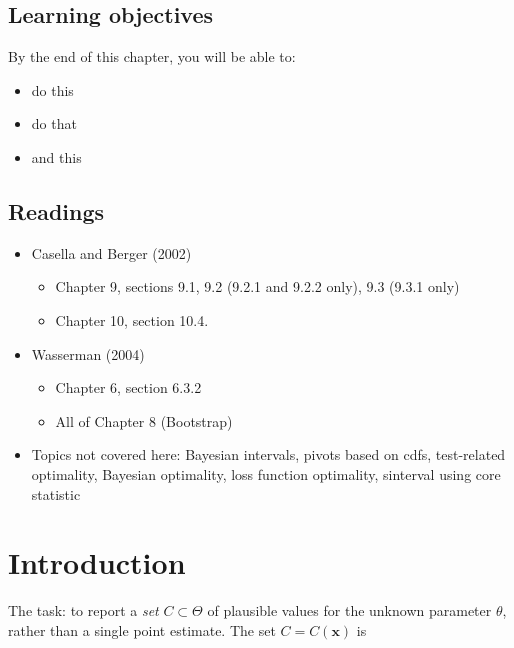 \documentclass[
]{book}
\providecommand{\tightlist}{%
  \setlength{\itemsep}{0pt}\setlength{\parskip}{0pt}}
\newcommand{\bx}{{\boldsymbol x}}
\theoremstyle{definition}
\theoremstyle{definition}
\theoremstyle{definition}
\theoremstyle{definition}
\theoremstyle{remark}
\begin{document}
\hypertarget{learning-objectives-5}{%
\subsection*{Learning objectives}\label{learning-objectives-5}}

By the end of this chapter, you will be able to:

\begin{itemize}
\tightlist
\item
  do this
\item
  do that
\item
  and this
\end{itemize}

\hypertarget{readings-5}{%
\subsection*{Readings}\label{readings-5}}

\begin{itemize}
\tightlist
\item
  Casella and Berger (2002)

  \begin{itemize}
  \tightlist
  \item
    Chapter 9, sections 9.1, 9.2 (9.2.1 and 9.2.2 only), 9.3 (9.3.1 only)
  \item
    Chapter 10, section 10.4.
  \end{itemize}
\item
  Wasserman (2004)

  \begin{itemize}
  \tightlist
  \item
    Chapter 6, section 6.3.2
  \item
    All of Chapter 8 (Bootstrap)
  \end{itemize}
\item
  Topics not covered here: Bayesian intervals, pivots based on cdfs, test-related optimality, Bayesian optimality, loss function optimality, sinterval using core statistic
\end{itemize}

\hypertarget{introduction-2}{%
\section{Introduction}\label{introduction-2}}

The task: to report a \emph{set} \(C\subset \Theta\) of plausible values for the unknown parameter \(\theta\), rather than a single point estimate.
The set \(C=C(\bx)\) is
\end{document}
